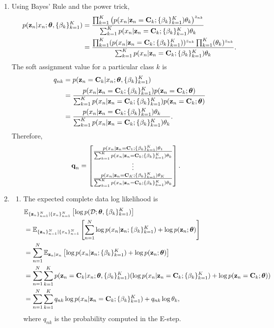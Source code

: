 \documentclass[submit]{harvardml}
\begin{document}
\begin{enumerate}
  \item Using Bayes' Rule and the power trick,
  \begin{align*}
  	p(\mathbf{z}_n|x_n; \boldsymbol{\theta}, \{\beta_k\}^K_{k=1})
  	&=\frac{\prod_{k=1}^K \left(p(x_n|\mathbf{z}_n=\mathbf{C}_k; \{\beta_k\}^K_{k=1})\theta_k\right)^{z_{nk}}}{\sum_{k=1}^Kp(x_n|\mathbf{z}_n=\mathbf{C}_k; \{\beta_k\}^K_{k=1})\theta_k} \\
  	 &=\frac{\prod_{k=1}^K (p(x_n|\mathbf{z}_n=\mathbf{C}_k; \{\beta_k\}^K_{k=1}))^{z_{nk}} \prod_{k=1}^K (\theta_k)^{z_{nk}}}{\sum_{k=1}^Kp(x_n|\mathbf{z}_n=\mathbf{C}_k; \{\beta_k\}^K_{k=1})\theta_k}.
  \end{align*}
	The soft assignment value for a particular class $k$ is
	\begin{align*}
		q_{nk} &= p(\mathbf{z}_n = \mathbf{C}_k |x_n; \boldsymbol{\theta}, \{\beta_k\}^K_{k=1}) \\
		&= \frac{p(x_n|\mathbf{z}_n = \mathbf{C}_k; \{\beta_k\}^K_{k=1})p(\mathbf{z}_n = \mathbf{C}_k; \boldsymbol{\theta})}{\sum_{k=1}^Kp(x_n|\mathbf{z}_n = \mathbf{C}_k; \{\beta_k\}^K_{k=1})p(\mathbf{z}_n = \mathbf{C}_k; \boldsymbol{\theta})} \\
		&= \frac{p(x_n|\mathbf{z}_n = \mathbf{C}_k; \{\beta_k\}^K_{k=1})\theta_k}{\sum_{k=1}^Kp(x_n|\mathbf{z}_n = \mathbf{C}_k; \{\beta_k\}^K_{k=1})\theta_k}.
	\end{align*}
	Therefore,
	 \begin{align*}
		\textbf{q}_n &= \begin{bmatrix}
			\frac{p(x_n|\mathbf{z}_n = \mathbf{C}_1; \{\beta_k\}^K_{k=1})\theta_1}{\sum_{k=1}^Kp(x_n|\mathbf{z}_n = \mathbf{C}_k; \{\beta_k\}^K_{k=1})\theta_k} \\
			\vdots \\
			\frac{p(x_n|\mathbf{z}_n = \mathbf{C}_K; \{\beta_k\}^K_{k=1})\theta_K}{\sum_{k=1}^Kp(x_n|\mathbf{z}_n = \mathbf{C}_k; \{\beta_k\}^K_{k=1})\theta_k}
		\end{bmatrix}.
	\end{align*}
  
  \item 
    \begin{enumerate}
      \item The expected complete data log likelihood is
      \begin{align*}
      &\mathbb{E}_{\{\mathbf{z}_n\}_{n=1}^N | \{x_n\}_{n=1}^N} \left[\log p(\mathcal D; \boldsymbol{\theta}, \{\beta_k\}^K_{k=1})\right] \\
      &= \mathbb{E}_{\{\mathbf{z}_n\}_{n=1}^N | \{x_n\}_{n=1}^N} \left[\sum_{n=1}^N \log p(x_n|\mathbf{z}_n; \{\beta_k\}^K_{k=1}) + \log p(\mathbf{z}_n; \boldsymbol{\theta})\right] \\
	  &= \sum_{n=1}^N \mathbb{E}_{\mathbf{z}_n | x_n} \left[\log p(x_n|\mathbf{z}_n; \{\beta_k\}^K_{k=1}) + \log p(\mathbf{z}_n; \boldsymbol{\theta})\right] \\
	  &= \sum_{n=1}^N \sum_{k=1}^K p(\mathbf{z}_n = \mathbf{C}_k|x_n; \boldsymbol{\theta}, \{\beta_k\}^K_{k=1}) (\log p(x_n|\mathbf{z}_n = \mathbf{C}_k; \{\beta_k\}^K_{k=1}) + \log p(\mathbf{z}_n = \mathbf{C}_k; \boldsymbol{\theta})) \\
	  &= \sum_{n=1}^N \sum_{k=1}^K q_{nk} \log p(x_n|\mathbf{z}_n = \mathbf{C}_k; \{\beta_k\}^K_{k=1}) + q_{nk} \log \theta_k,
      \end{align*}
      where $q_{nk}$ is the probability computed in the E-step.


\end{enumerate}
\end{enumerate}
\end{document}
